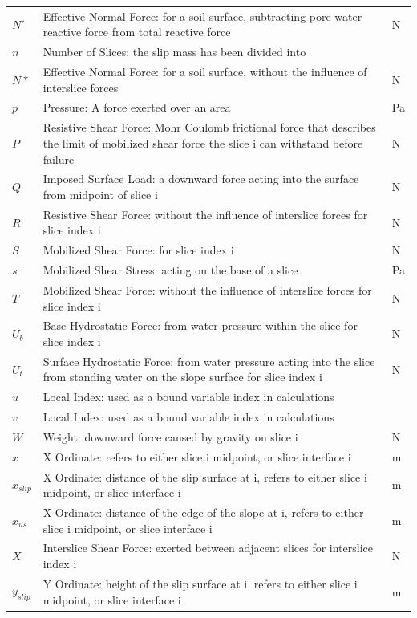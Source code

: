 \documentclass[12pt]{article}
\begin{document}
\begin{longtabu}{l X[l] l}
\\
$N'$ & Effective Normal Force: for a soil surface, subtracting pore water reactive force from total reactive force & N
\\
$n$ & Number of Slices: the slip mass has been divided into & 
\\
$N*$ & Effective Normal Force: for a soil surface, without the influence of interslice forces & N
\\
$p$ & Pressure: A force exerted over an area & Pa
\\
$P$ & Resistive Shear Force: Mohr Coulomb frictional force that describes the limit of mobilized shear force the slice i can withstand before failure & N
\\
$Q$ & Imposed Surface Load: a downward force acting into the surface from midpoint of slice i & N
\\
$R$ & Resistive Shear Force: without the influence of interslice forces for slice index i & N
\\
$S$ & Mobilized Shear Force: for slice index i & N
\\
$s$ & Mobilized Shear Stress: acting on the base of a slice & Pa
\\
$T$ & Mobilized Shear Force: without the influence of interslice forces for slice index i & N
\\
${U_{b}}$ & Base Hydrostatic Force: from water pressure within the slice for slice index i & N
\\
${U_{t}}$ & Surface Hydrostatic Force: from water pressure acting into the slice from standing water on the slope surface for slice index i & N
\\
$u$ & Local Index: used as a bound variable index in calculations & 
\\
$v$ & Local Index: used as a bound variable index in calculations & 
\\
$W$ & Weight: downward force caused by gravity on slice i & N
\\
$x$ & X Ordinate: refers to either slice i midpoint, or slice interface i & m
\\
${x_{slip}}$ & X Ordinate: distance of the slip surface at i, refers to either slice i midpoint, or slice interface i & m
\\
${x_{us}}$ & X Ordinate: distance of the edge of the slope at i, refers to either slice i midpoint, or slice interface i & m
\\
$X$ & Interslice Shear Force: exerted between adjacent slices for interslice index i & N
\\
${y_{slip}}$ & Y Ordinate: height of the slip surface at i, refers to either slice i midpoint, or slice interface i & m

\end{longtabu}
\end{document}
